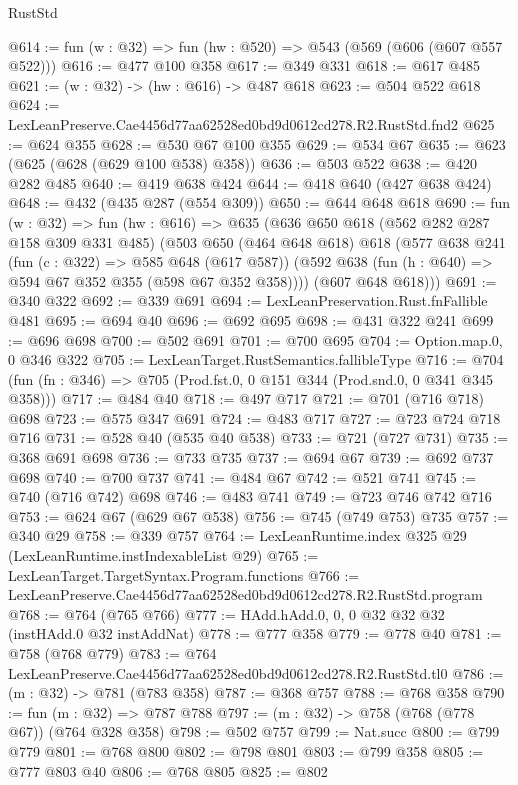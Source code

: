\begin{lexlean}{RustStd}
\begin{coremodule}
@614 := fun (w : @32) => fun (hw : @520) => @543 (@569 (@606 (@607 @557 @522)))
@616 := @477 @100 @358
@617 := @349 @331
@618 := @617 @485
@621 := (w : @32) -> (hw : @616) -> @487 @618
@623 := @504 @522 @618
@624 := LexLeanPreserve.Cae4456d77aa62528ed0bd9d0612cd278.R2.RustStd.fnd2
@625 := @624 @355
@628 := @530 @67 @100 @355
@629 := @534 @67
@635 := @623 (@625 (@628 (@629 @100 @538) @358))
@636 := @503 @522
@638 := @420 @282 @485
@640 := @419 @638 @424
@644 := @418 @640 (@427 @638 @424)
@648 := @432 (@435 @287 (@554 @309))
@650 := @644 @648 @618
@690 := fun (w : @32) =>
  fun (hw : @616) =>
  @635
    (@636
      @650
      @618
      (@562 @282 @287 @158 @309 @331 @485)
      (@503
        @650
        (@464 @648 @618)
        @618
        (@577
          @638
          @241
          (fun (c : @322) => @585 @648 (@617 @587))
          (@592 @638 (fun (h : @640) => @594 @67 @352 @355 (@598 @67 @352 @358))))
        (@607 @648 @618)))
@691 := @340 @322
@692 := @339 @691
@694 := LexLeanPreservation.Rust.fnFallible @481
@695 := @694 @40
@696 := @692 @695
@698 := @431 @322 @241
@699 := @696 @698
@700 := @502 @691
@701 := @700 @695
@704 := Option.map.{0, 0} @346 @322
@705 := LexLeanTarget.RustSemantics.fallibleType
@716 := @704 (fun (fn : @346) => @705 (Prod.fst.{0, 0} @151 @344 (Prod.snd.{0, 0} @341 @345 @358)))
@717 := @484 @40
@718 := @497 @717
@721 := @701 (@716 @718) @698
@723 := @575 @347 @691
@724 := @483 @717
@727 := @723 @724 @718 @716
@731 := @528 @40 (@535 @40 @538)
@733 := @721 (@727 @731)
@735 := @368 @691 @698
@736 := @733 @735
@737 := @694 @67
@739 := @692 @737 @698
@740 := @700 @737
@741 := @484 @67
@742 := @521 @741
@745 := @740 (@716 @742) @698
@746 := @483 @741
@749 := @723 @746 @742 @716
@753 := @624 @67 (@629 @67 @538)
@756 := @745 (@749 @753) @735
@757 := @340 @29
@758 := @339 @757
@764 := LexLeanRuntime.index @325 @29 (LexLeanRuntime.instIndexableList @29)
@765 := LexLeanTarget.TargetSyntax.Program.functions
@766 := LexLeanPreserve.Cae4456d77aa62528ed0bd9d0612cd278.R2.RustStd.program
@768 := @764 (@765 @766)
@777 := HAdd.hAdd.{0, 0, 0} @32 @32 @32 (instHAdd.{0} @32 instAddNat)
@778 := @777 @358
@779 := @778 @40
@781 := @758 (@768 @779)
@783 := @764 LexLeanPreserve.Cae4456d77aa62528ed0bd9d0612cd278.R2.RustStd.tl0
@786 := (m : @32) -> @781 (@783 @358)
@787 := @368 @757
@788 := @768 @358
@790 := fun (m : @32) => @787 @788
@797 := (m : @32) -> @758 (@768 (@778 @67)) (@764 @328 @358)
@798 := @502 @757
@799 := Nat.succ
@800 := @799 @779
@801 := @768 @800
@802 := @798 @801
@803 := @799 @358
@805 := @777 @803 @40
@806 := @768 @805
@825 := @802

\end{coremodule}
\end{lexlean}
